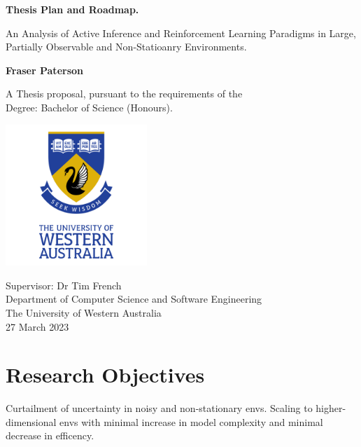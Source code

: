 \documentclass[12pt, twoside]{report}
\begin{document}
\begin{titlepage}
	\begin{center}
	
	\vspace*{0.5cm}
	
	\Huge
	\textbf{Thesis Plan and Roadmap.}
	
	\vspace{0.5cm}
	\Large
	An Analysis of Active Inference and Reinforcement Learning Paradigms in Large, Partially Observable and Non-Statioanry Environments.
	
	\vspace{1.5cm}

	\textbf{Fraser Paterson}

	\vspace{1.5cm}

	A Thesis proposal, pursuant to the requirements of the\\ 
	Degree: Bachelor of Science (Honours).  
	
	\vspace{2.0cm}

	\includegraphics[width=0.4\textwidth]{UWA_Logo.png}
	
	\vspace{2.0cm}	
	
	\Large
	Supervisor: Dr Tim French\\ 
	Department of Computer Science and Software Engineering\\
	The University of Western Australia\\
	27 March 2023
	
	\end{center}
\end{titlepage}


\tableofcontents

\cleardoublepage


\section{Research Objectives}
Curtailment of uncertainty in noisy and non-stationary envs.
Scaling to higher-dimensional envs with minimal increase in model complexity and minimal decrease in efficency. 
\end{document}
